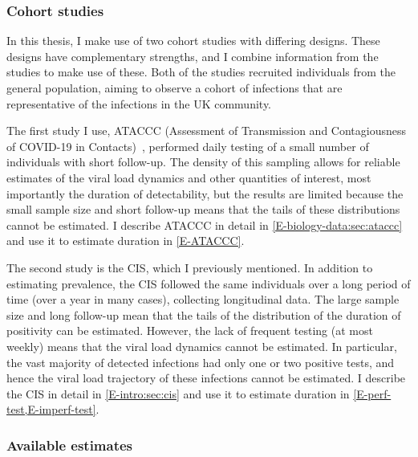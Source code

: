 \documentclass[thesis.tex]{subfiles}
\begin{document}
\subsubsection{Cohort studies}

In this thesis, I make use of two cohort studies with differing designs.
These designs have complementary strengths, and I combine information from the studies to make use of these.
Both of the studies recruited individuals from the general population, aiming to observe a cohort of infections that are representative of the infections in the UK community.

The first study I use, ATACCC (Assessment of Transmission and Contagiousness of COVID-19 in Contacts)~\autocite{singanayagamCommunity,hakkiOnset}, performed daily testing of a small number of individuals with short follow-up.
The density of this sampling allows for reliable estimates of the viral load dynamics and other quantities of interest, most importantly the duration of detectability, but the results are limited because the small sample size and short follow-up means that the tails of these distributions cannot be estimated.
I describe ATACCC in detail in \cref{E-biology-data:sec:ataccc} and use it to estimate duration in \cref{E-ATACCC}.

The second study is the CIS, which I previously mentioned.
In addition to estimating prevalence, the CIS followed the same individuals over a long period of time (over a year in many cases), collecting longitudinal data.
The large sample size and long follow-up mean that the tails of the distribution of the duration of positivity can be estimated.
However, the lack of frequent testing (at most weekly) means that the viral load dynamics cannot be estimated.
In particular, the vast majority of detected infections had only one or two positive tests, and hence the viral load trajectory of these infections cannot be estimated.
I describe the CIS in detail in \cref{E-intro:sec:cis} and use it to estimate duration in \cref{E-perf-test,E-imperf-test}.


\subsubsection{Available estimates}
\end{document}
